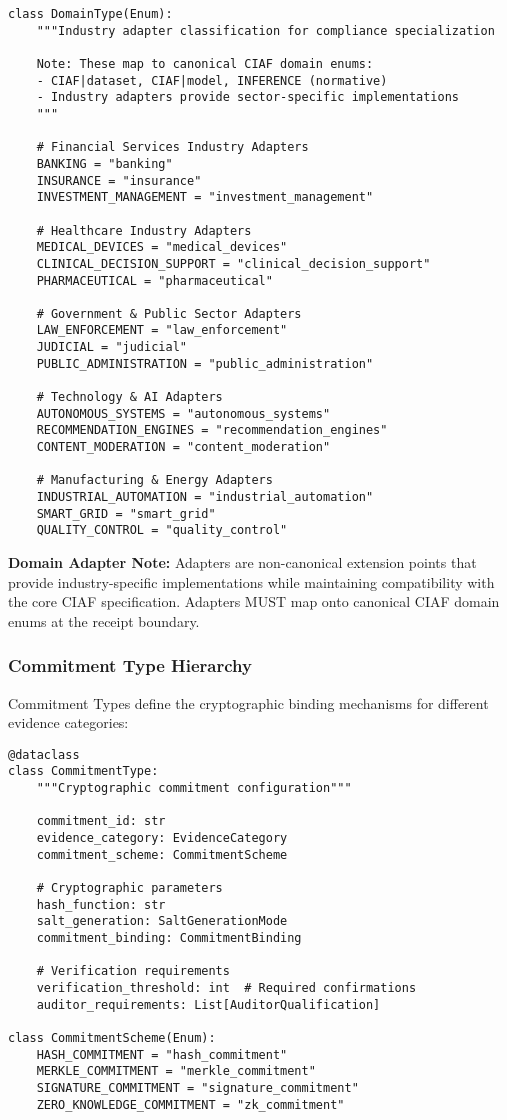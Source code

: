 \documentclass[12pt,a4paper]{article}
\begin{document}
\begin{lstlisting}[caption=Industry Adapter Domain Types]
class DomainType(Enum):
    """Industry adapter classification for compliance specialization
    
    Note: These map to canonical CIAF domain enums:
    - CIAF|dataset, CIAF|model, INFERENCE (normative)
    - Industry adapters provide sector-specific implementations
    """
    
    # Financial Services Industry Adapters
    BANKING = "banking"
    INSURANCE = "insurance" 
    INVESTMENT_MANAGEMENT = "investment_management"
    
    # Healthcare Industry Adapters
    MEDICAL_DEVICES = "medical_devices"
    CLINICAL_DECISION_SUPPORT = "clinical_decision_support"
    PHARMACEUTICAL = "pharmaceutical"
    
    # Government & Public Sector Adapters
    LAW_ENFORCEMENT = "law_enforcement"
    JUDICIAL = "judicial"
    PUBLIC_ADMINISTRATION = "public_administration"
    
    # Technology & AI Adapters
    AUTONOMOUS_SYSTEMS = "autonomous_systems"
    RECOMMENDATION_ENGINES = "recommendation_engines"
    CONTENT_MODERATION = "content_moderation"
    
    # Manufacturing & Energy Adapters
    INDUSTRIAL_AUTOMATION = "industrial_automation"
    SMART_GRID = "smart_grid"
    QUALITY_CONTROL = "quality_control"
\end{lstlisting}

\textbf{Domain Adapter Note:} Adapters are non-canonical extension points that provide industry-specific implementations while maintaining compatibility with the core CIAF specification. Adapters MUST map onto canonical CIAF domain enums at the receipt boundary.

\subsubsection{Commitment Type Hierarchy}

Commitment Types define the cryptographic binding mechanisms for different evidence categories:

\begin{lstlisting}[caption=Commitment Type Implementation]
@dataclass
class CommitmentType:
    """Cryptographic commitment configuration"""
    
    commitment_id: str
    evidence_category: EvidenceCategory
    commitment_scheme: CommitmentScheme
    
    # Cryptographic parameters
    hash_function: str
    salt_generation: SaltGenerationMode
    commitment_binding: CommitmentBinding
    
    # Verification requirements
    verification_threshold: int  # Required confirmations
    auditor_requirements: List[AuditorQualification]
    
class CommitmentScheme(Enum):
    HASH_COMMITMENT = "hash_commitment"
    MERKLE_COMMITMENT = "merkle_commitment"
    SIGNATURE_COMMITMENT = "signature_commitment"
    ZERO_KNOWLEDGE_COMMITMENT = "zk_commitment"
\end{lstlisting}
\end{document}
